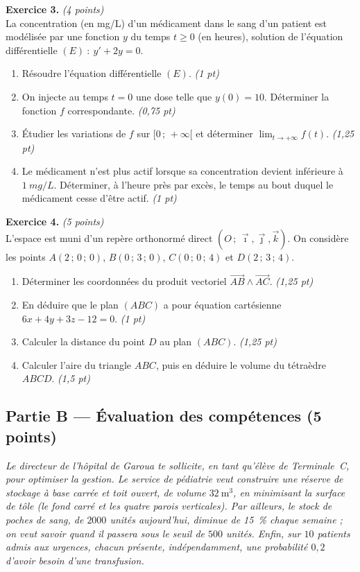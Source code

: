 \smallskip
\noindent\textbf{Exercice 3.} \hfill\textit{(4 points)}\\
La concentration (en mg/L) d'un médicament dans le sang d'un patient est modélisée
par une fonction $y$ du temps $t\ge0$ (en heures), solution de l'équation
différentielle $(E)\ :\ y'+2y=0$.
\begin{enumerate}[label=\arabic*)]
\item Résoudre l'équation différentielle $(E)$. \hfill\textit{(1 pt)}
\item On injecte au temps $t=0$ une dose telle que $y(0)=10$. Déterminer la
fonction $f$ correspondante. \hfill\textit{(0,75 pt)}
\item Étudier les variations de $f$ sur $[0\,;\,+\infty[$ et déterminer
$\lim_{t\to+\infty}f(t)$. \hfill\textit{(1,25 pt)}
\item Le médicament n'est plus actif lorsque sa concentration devient inférieure à
$\SI{1}{mg/L}$. Déterminer, à l'heure près par excès, le temps au bout duquel le
médicament cesse d'être actif. \hfill\textit{(1 pt)}
\end{enumerate}

\smallskip
\noindent\textbf{Exercice 4.} \hfill\textit{(5 points)}\\
L'espace est muni d'un repère orthonormé direct $(O\,;\,\vec\imath,\vec\jmath,
\vec k)$. On considère les points $A(2\,;\,0\,;\,0)$, $B(0\,;\,3\,;\,0)$,
$C(0\,;\,0\,;\,4)$ et $D(2\,;\,3\,;\,4)$.
\begin{enumerate}[label=\arabic*)]
\item Déterminer les coordonnées du produit vectoriel
$\overrightarrow{AB}\wedge\overrightarrow{AC}$. \hfill\textit{(1,25 pt)}
\item En déduire que le plan $(ABC)$ a pour équation cartésienne
$6x+4y+3z-12=0$. \hfill\textit{(1 pt)}
\item Calculer la distance du point $D$ au plan $(ABC)$. \hfill\textit{(1,25 pt)}
\item Calculer l'aire du triangle $ABC$, puis en déduire le volume du tétraèdre
$ABCD$. \hfill\textit{(1,5 pt)}
\end{enumerate}

\subsection*{Partie B — Évaluation des compétences \hfill (5 points)}

\noindent\textit{Le directeur de l'hôpital de Garoua te sollicite, en tant
qu'élève de Terminale~C, pour optimiser la gestion. Le service de pédiatrie veut
construire une réserve de stockage à \emph{base carrée} et toit ouvert, de volume
$\SI{32}{\metre\cubed}$, en minimisant la surface de tôle (le fond carré et les
quatre parois verticales). Par ailleurs, le stock de poches de sang, de
$2000$ unités aujourd'hui, diminue de \SI{15}{\percent} chaque semaine ; on veut
savoir quand il passera sous le seuil de $500$ unités. Enfin, sur $10$ patients
admis aux urgences, chacun présente, indépendamment, une probabilité $0{,}2$
d'avoir besoin d'une transfusion.}

